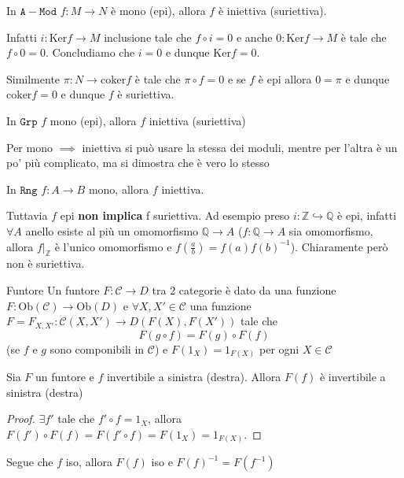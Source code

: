 \begin{example}{}
    In \(\mathtt{A-Mod}\) \(f : M \to N\) è mono (epi), allora \(f\) è iniettiva (suriettiva).

    Infatti \(i : \mathrm{Ker}f \to M\) inclusione tale che \(f \circ i = 0\) e
    anche \(0 : \mathrm{Ker}f \to M\) è tale che \(f \circ 0 = 0\). Concludiamo
    che \(i = 0\) e dunque \(\mathrm{Ker}f = 0\).

    Similmente \(\pi : N \to \mathrm{coker}f\) è tale che \(\pi \circ f = 0\) e
    se \(f\) è epi allora \(0 = \pi \) e dunque \(\mathrm{coker} f= 0\) e dunque
    \(f\) è suriettiva.
\end{example}

\begin{example}{}
    In \(\mathtt{Grp}\) \(f\) mono (epi), allora \(f\) iniettiva (suriettiva)

    Per mono \(\implies \) iniettiva si può usare la stessa dei moduli, mentre
    per l'altra è un po' più complicato, ma si dimostra che è vero lo stesso
\end{example}

\begin{example}{}
    In \(\mathtt{Rng}\) \(f : A\to B\) mono, allora \(f\) iniettiva. %

    Tuttavia \(f\) epi \textbf{non implica} f suriettiva. Ad esempio preso \(i :
    \mathbb{Z} \hookrightarrow \mathbb{Q}\) è epi, infatti \(\forall A\) anello
    esiste al più un omomorfismo \(\mathbb{Q} \to A\) (\(f : \mathbb{Q}\to A\)
    sia omomorfismo, allora \(f|_{\mathbb{Z}} \) è l'unico omomorfismo e \(f{(\frac{a}{b})} = f{(a)}f{(b)}^{-1}\)). Chiaramente però non è suriettiva.
\end{example}

\begin{definition}{Funtore}
    Un funtore \(F : \mathcal{C} \to D\) tra 2 categorie è dato da una funzione
    \(F : \mathrm{Ob}{(\mathcal{C})} \to \mathrm{Ob}{(D)}\) e \(\forall X, X' \in \mathcal{C}\) una
    funzione \(F = F_{X, X'} : \mathcal{C}{(X, X')} \to D{(F{(X)}, F{(X')})}\) tale che
    \[
      F{(g\circ f)} = F{(g)}\circ F{(f)} 
    \]
    (se \(f\) e \(g\) sono componibili in \(\mathcal{C}\)) e \(F{(1_X)} = 1_{F{(X)}} \)
    per ogni \(X \in \mathcal{C}\) 
    
\end{definition}
\begin{proposition}{}
    Sia \(F\) un funtore e \(f\) invertibile a sinistra (destra). Allora \(F{(f)}\) è invertibile a sinistra (destra)
\end{proposition}
\begin{proof}{}
    \(\exists f'\) tale che \(f' \circ f = 1_X\), allora \(F{(f')} \circ F{(f)} = F{(f'\circ f)} = F{(1_X)} = 1_{F{(X)}} \).
\end{proof}
\begin{remark}{}
    Segue che \(f\) iso, allora \(F{(f)}\) iso e \(F{(f)}^{-1} = F{(f^{-1})}\) 
\end{remark}

